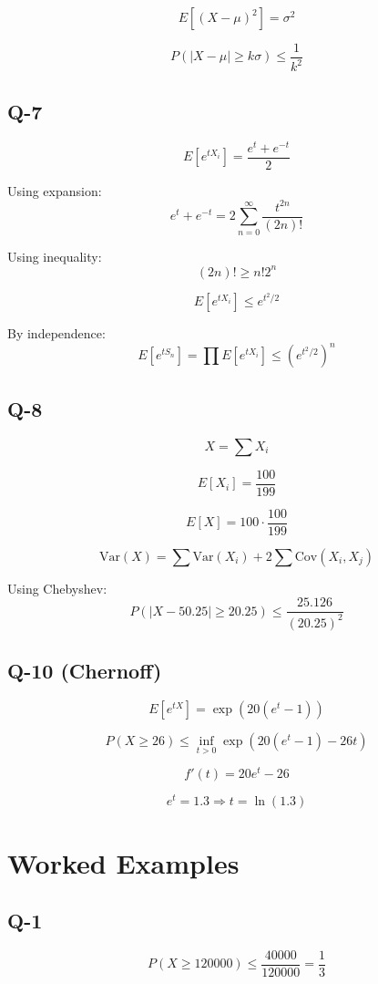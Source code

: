 \documentclass[12pt]{article}
\begin{document}
\[
E[(X - \mu)^2] = \sigma^2
\]

\[
P(|X - \mu| \ge k\sigma) \le \frac{1}{k^2}
\]

\subsection*{Q-7}

\[
E[e^{tX_i}] = \frac{e^t + e^{-t}}{2}
\]

Using expansion:
\[
e^t + e^{-t} = 2 \sum_{n=0}^{\infty} \frac{t^{2n}}{(2n)!}
\]

Using inequality:
\[
(2n)! \ge n! 2^n
\]

\[
E[e^{tX_i}] \le e^{t^2/2}
\]

By independence:
\[
E[e^{tS_n}] = \prod E[e^{tX_i}] \le (e^{t^2/2})^n
\]

\subsection*{Q-8}

\[
X = \sum X_i
\]

\[
E[X_i] = \frac{100}{199}
\]

\[
E[X] = 100 \cdot \frac{100}{199}
\]

\[
\mathrm{Var}(X) = \sum \mathrm{Var}(X_i) + 2 \sum \mathrm{Cov}(X_i, X_j)
\]

Using Chebyshev:
\[
P(|X - 50.25| \ge 20.25) \le \frac{25.126}{(20.25)^2}
\]

\subsection*{Q-10 (Chernoff)}

\[
E[e^{tX}] = \exp(20(e^t - 1))
\]

\[
P(X \ge 26) \le \inf_{t>0} \exp(20(e^t - 1) - 26t)
\]

\[
f'(t) = 20e^t - 26
\]

\[
e^t = 1.3 \Rightarrow t = \ln(1.3)
\]

\section*{Worked Examples}

\subsection*{Q-1}

\[
P(X \ge 120000) \le \frac{40000}{120000} = \frac{1}{3}
\]
\end{document}
